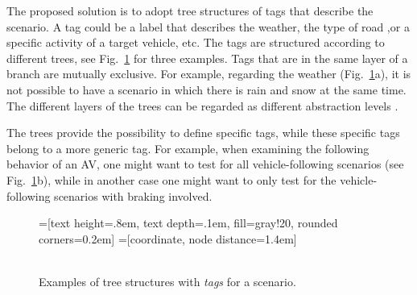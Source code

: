 The proposed solution is to adopt tree structures of tags that describe the scenario. A tag could be a label that describes the weather, the type of road ,or a specific activity of a target vehicle, etc. The tags are structured according to different trees, see Fig.~\ref{fig:tag trees} for three examples. Tags that are in the same layer of a branch are mutually exclusive. For example, regarding the weather (Fig.~\ref{fig:tag trees}a), it is not possible to have a scenario in which there is rain and snow at the same time. The different layers of the trees can be regarded as different abstraction levels \cite{Bonnin2014}. 

The trees provide the possibility to define specific tags, while these specific tags belong to a more generic tag. For example, when examining the following behavior of an AV, one might want to test for all vehicle-following scenarios (see Fig.~\ref{fig:tag trees}b), while in another case one might want to only test for the vehicle-following scenarios with braking involved.


\begin{figure}
	\centering
	=[text height=.8em, text depth=.1em, fill=gray!20, rounded corners=0.2em]
	=[coordinate, node distance=1.4em]
	 \\
	\\
	\caption{Examples of tree structures with \emph{tags} for a scenario.}
	\label{fig:tag trees}
\end{figure}
